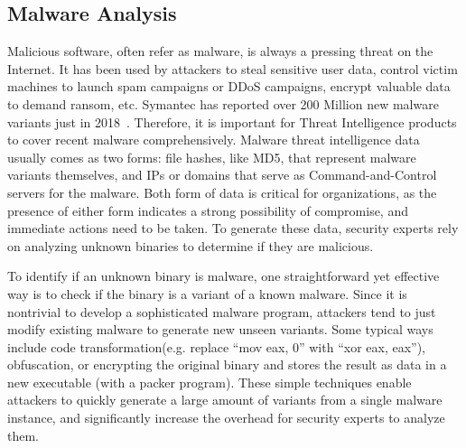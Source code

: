 \subsection{Malware Analysis}
Malicious software, often refer as malware, is always a pressing threat 
on the Internet. It has been used
by attackers to steal sensitive user data, control victim machines
to launch spam campaigns or DDoS campaigns, encrypt valuable data to 
demand ransom, etc. Symantec has reported over 200 Million new malware
variants just in 2018~\cite{symantecmalware}. Therefore, it is important 
for Threat Intelligence products to cover recent malware comprehensively.
Malware threat intelligence data usually comes as two forms: file hashes,
like MD5, that represent malware variants themselves, and IPs or domains
that serve as Command-and-Control servers for the malware. Both form of 
data is critical for organizations, as the presence of either form 
indicates a strong possibility of compromise, and immediate actions need 
to be taken. To generate these data, security experts rely on analyzing 
unknown binaries to determine if they are malicious.

To identify if an unknown binary is malware, one straightforward yet
effective way is to check if the binary is a variant of a known malware.
Since it is nontrivial to develop a sophisticated malware program, 
attackers tend to just modify existing malware to generate new unseen
variants. Some typical ways include code transformation(e.g. replace ``mov 
eax, 0'' with ``xor eax, eax''), obfuscation, or encrypting the original 
binary and stores the result as data in a new executable (with a packer 
program). These simple techniques enable attackers to quickly generate a 
large amount of variants from a single malware instance, and significantly 
increase the overhead for security experts to analyze them.

